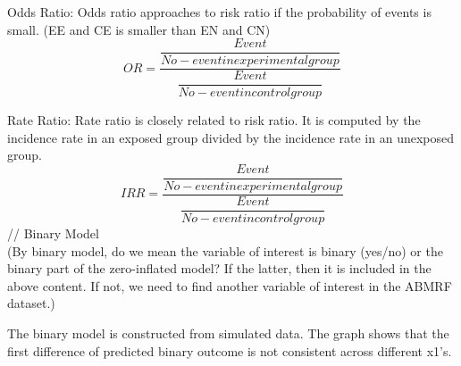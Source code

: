 \documentclass[jou, apacite]{apa6}
\begin{document}
Odds Ratio: Odds ratio approaches to risk ratio if the probability of events is small. (EE and CE is smaller than EN and CN)\\
\begin{equation}
OR = \dfrac{\dfrac{Event}{No-event in experimental group}}{\dfrac{Event}{No-event in control group}}
\end{equation}

Rate Ratio: Rate ratio is closely related to risk ratio. It is computed by the incidence rate in an exposed group divided by the incidence rate in an unexposed group. \\
\begin{equation}
IRR = \dfrac{\dfrac{Event}{No-eventin  experimental group}}{\dfrac{Event}{No-event in control group}}
\end{equation}
// Binary Model \\
(By binary model, do we mean the variable of interest is binary (yes/no) or the binary part of the zero-inflated model? If the latter, then it is included in the above content. If not, we need to find another variable of interest in the ABMRF dataset.)


The binary model is constructed from simulated data. The graph shows that the first difference of predicted binary outcome is not consistent across different x1's. 
\end{document}

